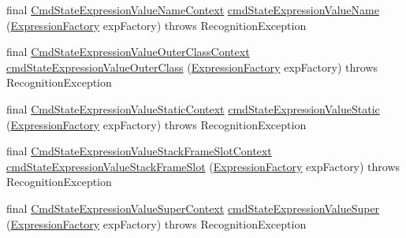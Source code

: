 \begin{DoxyCompactItemize}
\item 
final \hyperlink{classgov_1_1nasa_1_1jpf_1_1inspector_1_1server_1_1expression_1_1parser_1_1_expression_grammar_pa79fe925a020ecc7299d05e3047f2cfe9}{Cmd\+State\+Expression\+Value\+Name\+Context} \hyperlink{classgov_1_1nasa_1_1jpf_1_1inspector_1_1server_1_1expression_1_1parser_1_1_expression_grammar_parser_ab7b7d7ff1d67db1969528b9cb4557d4e}{cmd\+State\+Expression\+Value\+Name} (\hyperlink{classgov_1_1nasa_1_1jpf_1_1inspector_1_1server_1_1expression_1_1_expression_factory}{Expression\+Factory} exp\+Factory)  throws Recognition\+Exception 
\item 
final \hyperlink{classgov_1_1nasa_1_1jpf_1_1inspector_1_1server_1_1expression_1_1parser_1_1_expression_grammar_paa97aac802c11881ff9166c765f4fc61a}{Cmd\+State\+Expression\+Value\+Outer\+Class\+Context} \hyperlink{classgov_1_1nasa_1_1jpf_1_1inspector_1_1server_1_1expression_1_1parser_1_1_expression_grammar_parser_a3cb4602fb37c47251dc62b7e1d7c9f0c}{cmd\+State\+Expression\+Value\+Outer\+Class} (\hyperlink{classgov_1_1nasa_1_1jpf_1_1inspector_1_1server_1_1expression_1_1_expression_factory}{Expression\+Factory} exp\+Factory)  throws Recognition\+Exception 
\item 
final \hyperlink{classgov_1_1nasa_1_1jpf_1_1inspector_1_1server_1_1expression_1_1parser_1_1_expression_grammar_pa08e6165e66cacb4d3382a343315ee767}{Cmd\+State\+Expression\+Value\+Static\+Context} \hyperlink{classgov_1_1nasa_1_1jpf_1_1inspector_1_1server_1_1expression_1_1parser_1_1_expression_grammar_parser_abeaf7544d2fb53e23e913f8d829ba78e}{cmd\+State\+Expression\+Value\+Static} (\hyperlink{classgov_1_1nasa_1_1jpf_1_1inspector_1_1server_1_1expression_1_1_expression_factory}{Expression\+Factory} exp\+Factory)  throws Recognition\+Exception 
\item 
final \hyperlink{classgov_1_1nasa_1_1jpf_1_1inspector_1_1server_1_1expression_1_1parser_1_1_expression_grammar_pa53e28d24e840d016fb7c58b2b73008ab}{Cmd\+State\+Expression\+Value\+Stack\+Frame\+Slot\+Context} \hyperlink{classgov_1_1nasa_1_1jpf_1_1inspector_1_1server_1_1expression_1_1parser_1_1_expression_grammar_parser_a6b064d2ec6f62d4260a820ef3c1864e9}{cmd\+State\+Expression\+Value\+Stack\+Frame\+Slot} (\hyperlink{classgov_1_1nasa_1_1jpf_1_1inspector_1_1server_1_1expression_1_1_expression_factory}{Expression\+Factory} exp\+Factory)  throws Recognition\+Exception 
\item 
final \hyperlink{classgov_1_1nasa_1_1jpf_1_1inspector_1_1server_1_1expression_1_1parser_1_1_expression_grammar_pa66c003646cac4c60d53e10c6587465ef}{Cmd\+State\+Expression\+Value\+Super\+Context} \hyperlink{classgov_1_1nasa_1_1jpf_1_1inspector_1_1server_1_1expression_1_1parser_1_1_expression_grammar_parser_ae563e67295fa935ca387e0ff9ec0d599}{cmd\+State\+Expression\+Value\+Super} (\hyperlink{classgov_1_1nasa_1_1jpf_1_1inspector_1_1server_1_1expression_1_1_expression_factory}{Expression\+Factory} exp\+Factory)  throws Recognition\+Exception 

\end{DoxyCompactItemize}
